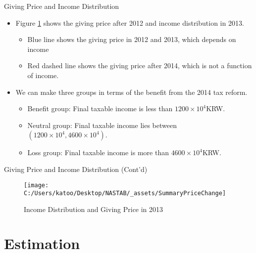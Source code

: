 \documentclass[
  ignorenonframetext,
]{beamer}
\providecommand{\tightlist}{%
  \setlength{\itemsep}{0pt}\setlength{\parskip}{0pt}}
\begin{document}
\begin{frame}{Giving Price and Income Distribution}
\protect\hypertarget{giving-price-and-income-distribution}{}
\begin{itemize}
\tightlist
\item
  Figure \ref{fig:showSummaryPriceChange} shows the giving price after 2012 and income distribution in 2013.

  \begin{itemize}
  \tightlist
  \item
    Blue line shows the giving price in 2012 and 2013, which depends on income
  \item
    Red dashed line shows the giving price after 2014, which is not a function of income.
  \end{itemize}
\item
  We can make three groups in terms of the benefit from the 2014 tax reform.

  \begin{itemize}
  \tightlist
  \item
    Benefit group: Final taxable income is less than \(1200 \times 10^4\)KRW.
  \item
    Neutral group: Final taxable income lies between \((1200 \times 10^4, 4600 \times 10^4)\).
  \item
    Loss group: Final taxable income is more than \(4600 \times 10^4\)KRW.
  \end{itemize}
\end{itemize}
\end{frame}

\begin{frame}{Giving Price and Income Distribution (Cont'd)}
\protect\hypertarget{giving-price-and-income-distribution-contd}{}
\begin{figure}

{\centering \texttt{[image: C:/Users/katoo/Desktop/NASTAB/\_assets/SummaryPriceChange]} 

}

\caption{Income Distribution and Giving Price in 2013}\label{fig:showSummaryPriceChange}
\end{figure}
\end{frame}

\hypertarget{estimation}{%
\section{Estimation}\label{estimation}}
\end{document}
